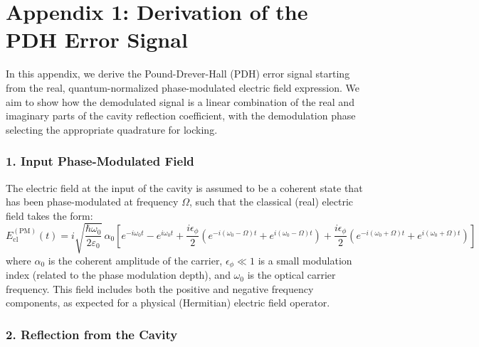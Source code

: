 
\chapter*{Appendix 1: Derivation of the PDH Error Signal }\label{app:PDH}

In this appendix, we derive the Pound-Drever-Hall (PDH) error signal starting from the real, quantum-normalized phase-modulated electric field expression. We aim to show how the demodulated signal is a linear combination of the real and imaginary parts of the cavity reflection coefficient, with the demodulation phase selecting the appropriate quadrature for locking.

\subsection*{1. Input Phase-Modulated Field}

The electric field at the input of the cavity is assumed to be a coherent state that has been phase-modulated at frequency \( \Omega \), such that the classical (real) electric field takes the form:
\begin{equation}
    E_{\text{cl}}^{(\text{PM})}(t) = i \sqrt{\frac{\hbar \omega_0}{2 \varepsilon_0}} \, \alpha_0 \left[
        e^{-i\omega_0 t} - e^{i\omega_0 t}
        + \frac{i \epsilon_\phi}{2} \left( e^{-i(\omega_0 - \Omega)t} + e^{i(\omega_0 - \Omega)t} \right)
        + \frac{i \epsilon_\phi}{2} \left( e^{-i(\omega_0 + \Omega)t} + e^{i(\omega_0 + \Omega)t} \right)
    \right]
    \label{eq:pm_field}
\end{equation}
where \( \alpha_0 \) is the coherent amplitude of the carrier, \( \epsilon_\phi \ll 1 \) is a small modulation index (related to the phase modulation depth), and \( \omega_0 \) is the optical carrier frequency. This field includes both the positive and negative frequency components, as expected for a physical (Hermitian) electric field operator.

\subsection*{2. Reflection from the Cavity}

